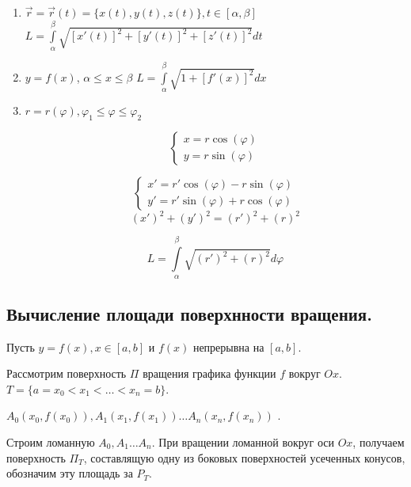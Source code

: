 \documentclass[a4paper,12pt]{article} %
\renewcommand {\leq}{\leqslant}
\begin{document}
\begin{enumerate}

    \item $\Vec{r} = \Vec{r}(t) = \{ x(t), y(t), z(t) \}, t \in [\alpha, \beta]$
    $L = \int \limits_\alpha^\beta \sqrt{[x'(t)]^2+[y'(t)]^2+[z'(t)]^2}dt$
    
    \item $y=f(x)$, $\alpha \leq x \leq \beta$
    $L=\int\limits_\alpha^\beta \sqrt{1+[f'(x)]^2}dx$
    
    \item $r=r(\varphi), \varphi_1 \leq \varphi \leq \varphi_2$
    
    \begin{equation*}
 \begin{cases}
  x=r \cos(\varphi)
   \\
   y = r \sin(\varphi)
   
 \end{cases}
\end{equation*}

 \begin{equation*}
 \begin{cases}
  x'=r' \cos(\varphi) - r\sin(\varphi)
   \\
   y' = r' \sin(\varphi) + r\cos(\varphi)
   
 \end{cases}
\end{equation*}
\begin{equation}
  (x')^2+(y')^2=(r')^2+(r)^2  
\end{equation}

\begin{equation}
  L =\int\limits_\alpha^\beta \sqrt{(r')^2+(r)^2}d\varphi 
\end{equation}

\end{enumerate}

\subsection{Вычисление площади поверхнности вращения.}

Пусть $y = f(x), x \in [a, b]$ и $f(x)$ непрерывна на $[a, b]$.

Рассмотрим поверхность $\Pi$ вращения графика функции $f$ вокруг $Ox$. $T = \{ a = x_0 < x_1<\dots<x_n = b \}$.

$A_0 (x_0, f(x_0)), A_1 (x_1, f(x_1)) \dots A_n(x_n, f(x_n))$ .

Строим ломанную $A_0, A_1\dots A_n$. При вращении ломанной вокруг оси $Ox$, получаем поверхность $\Pi_T$, составлящую одну из боковых поверхностей усеченных конусов, обозначим эту площадь за $P_T$.
\end{document}

